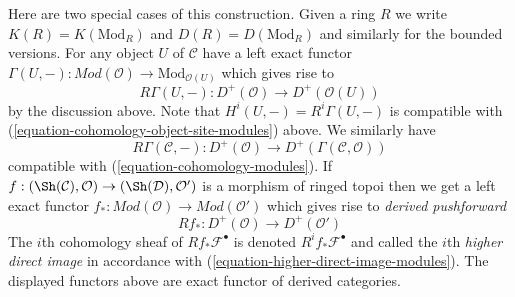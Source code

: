 \medskip\noindent
Here are two special cases of this construction. Given a ring $R$ we write
$K(R) = K(\text{Mod}_R)$ and $D(R) = D(\text{Mod}_R)$ and similarly for the
bounded versions. For any object $U$ of $\mathcal{C}$ have a left exact functor
$
\Gamma(U, -) :
\textit{Mod}(\mathcal{O})
\longrightarrow
\text{Mod}_{\mathcal{O}(U)}
$
which gives rise to
$$
R\Gamma(U, -) :
D^{+}(\mathcal{O})
\longrightarrow
D^{+}(\mathcal{O}(U))
$$
by the discussion above. Note that $H^i(U, -) = R^i\Gamma(U, -)$
is compatible with (\ref{equation-cohomology-object-site-modules}) above.
We similarly have
$$
R\Gamma(\mathcal{C}, -) :
D^{+}(\mathcal{O})
\longrightarrow
D^{+}(\Gamma(\mathcal{C}, \mathcal{O}))
$$
compatible with (\ref{equation-cohomology-modules}). If
$f : (\Sh(\mathcal{C}), \mathcal{O}) \to (\Sh(\mathcal{D}), \mathcal{O}')$
is a morphism of ringed topoi then we get a left exact functor
$f_* : \textit{Mod}(\mathcal{O}) \to \textit{Mod}(\mathcal{O}')$
which gives rise to {\it derived pushforward}
$$
Rf_* : D^{+}(\mathcal{O}) \to D^+(\mathcal{O}')
$$
The $i$th cohomology sheaf of $Rf_*\mathcal{F}^\bullet$ is denoted
$R^if_*\mathcal{F}^\bullet$ and called the $i$th {\it higher direct image}
in accordance with (\ref{equation-higher-direct-image-modules}).
The displayed functors above are exact functor
of derived categories.


